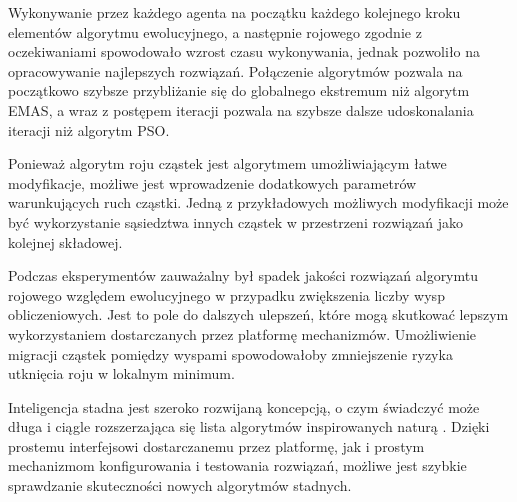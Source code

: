 Wykonywanie przez każdego agenta na początku każdego kolejnego kroku elementów algorytmu ewolucyjnego, a następnie rojowego zgodnie z oczekiwaniami spowodowało wzrost czasu wykonywania, jednak pozwoliło na opracowywanie najlepszych rozwiązań. Połączenie algorytmów pozwala na początkowo szybsze przybliżanie się do globalnego ekstremum niż algorytm EMAS, a wraz z postępem iteracji pozwala na szybsze dalsze udoskonalania iteracji niż algorytm PSO. 



Ponieważ algorytm roju cząstek jest algorytmem umożliwiającym łatwe modyfikacje, możliwe jest wprowadzenie dodatkowych parametrów warunkujących ruch cząstki. Jedną z przykładowych możliwych modyfikacji może być wykorzystanie sąsiedztwa innych cząstek w przestrzeni rozwiązań jako kolejnej składowej. 

Podczas eksperymentów zauważalny był spadek jakości rozwiązań algorymtu rojowego względem ewolucyjnego w przypadku zwiększenia liczby wysp obliczeniowych. Jest to pole do dalszych ulepszeń, które mogą skutkować lepszym wykorzystaniem dostarczanych przez platformę mechanizmów. Umożliwienie migracji cząstek pomiędzy wyspami spowodowałoby zmniejszenie ryzyka utknięcia roju w lokalnym minimum.

Inteligencja stadna jest szeroko rozwijaną koncepcją, o czym świadczyć może długa i ciągle rozszerzająca się lista algorytmów inspirowanych naturą \cite{listaswarm}. Dzięki prostemu interfejsowi dostarczanemu przez platformę, jak i prostym mechanizmom konfigurowania i testowania rozwiązań, możliwe jest szybkie sprawdzanie skuteczności nowych algorytmów stadnych. 




